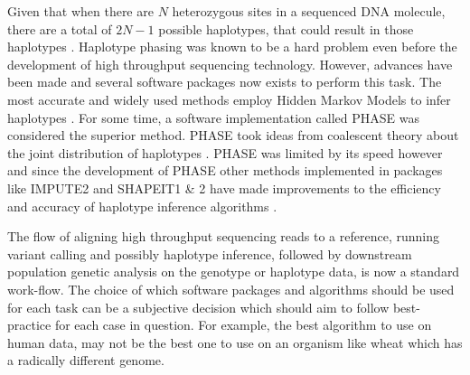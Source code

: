 Given that when there are $N$ heterozygous sites in a sequenced DNA molecule, there are a total of $2N-1$ possible haplotypes, that could result in those haplotypes \parencite{makinen2015genome}.
Haplotype phasing was known to be a hard problem even before the development of high throughput sequencing technology.
However, advances have been made and several software packages now exists to perform this task.
The most accurate and widely used methods employ Hidden Markov Models to infer haplotypes \cite{makinen2015genome}.
For some time, a software implementation called PHASE was considered the superior method.
PHASE took ideas from coalescent theory about the joint distribution of haplotypes \parencite{Marchini2007,Marchini2010,Howie2011}.
PHASE was limited by its speed however and since the development of PHASE other methods implemented in packages like IMPUTE2 and SHAPEIT1 \& 2 have made improvements to the efficiency and accuracy of haplotype inference algorithms \parencite{Stephens2003,Delaneau2012,Delaneau2013,Delaneau2013a,OConnell2014}.

The flow of aligning high throughput sequencing reads to a reference, running variant calling and possibly haplotype inference, followed by downstream population genetic analysis on the genotype or haplotype data, is now a standard work-flow.
The choice of which software packages and algorithms should be used for each task can be a subjective decision which should aim to follow best-practice for each case in question.
For example, the best algorithm to use on human data, may not be the best one to use on an organism like wheat which has a radically different genome.





